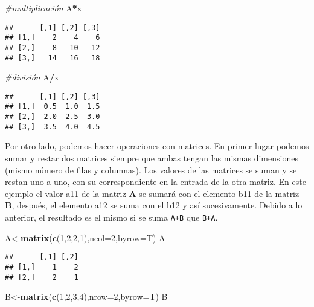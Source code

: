 \documentclass[
]{article}
\newenvironment{Shaded}{\begin{snugshade}}{\end{snugshade}}
\newcommand{\CommentTok}[1]{\textcolor[rgb]{0.56,0.35,0.01}{\textit{#1}}}
\newcommand{\DataTypeTok}[1]{\textcolor[rgb]{0.13,0.29,0.53}{#1}}
\newcommand{\DecValTok}[1]{\textcolor[rgb]{0.00,0.00,0.81}{#1}}
\newcommand{\KeywordTok}[1]{\textcolor[rgb]{0.13,0.29,0.53}{\textbf{#1}}}
\newcommand{\NormalTok}[1]{#1}
\newcommand{\OperatorTok}[1]{\textcolor[rgb]{0.81,0.36,0.00}{\textbf{#1}}}
\begin{document}
\begin{Shaded}
\begin{Highlighting}[]
\CommentTok{\#multiplicación}
\NormalTok{A}\OperatorTok{*}\NormalTok{x}
\end{Highlighting}
\end{Shaded}

\begin{verbatim}
##      [,1] [,2] [,3]
## [1,]    2    4    6
## [2,]    8   10   12
## [3,]   14   16   18
\end{verbatim}

\begin{Shaded}
\begin{Highlighting}[]
\CommentTok{\#división}
\NormalTok{A}\OperatorTok{/}\NormalTok{x}
\end{Highlighting}
\end{Shaded}

\begin{verbatim}
##      [,1] [,2] [,3]
## [1,]  0.5  1.0  1.5
## [2,]  2.0  2.5  3.0
## [3,]  3.5  4.0  4.5
\end{verbatim}

Por otro lado, podemos hacer operaciones con matrices. En primer lugar
podemos sumar y restar dos matrices siempre que ambas tengan las mismas
dimensiones (mismo número de filas y columnas). Los valores de las
matrices se suman y se restan uno a uno, con su correspondiente en la
entrada de la otra matriz. En este ejemplo el valor a11 de la matriz
\textbf{A} se sumará con el elemento b11 de la matriz \textbf{B},
después, el elemento a12 se suma con el b12 y así sucesivamente. Debido
a lo anterior, el resultado es el mismo si se suma \texttt{A+B} que
\texttt{B+A}.

\begin{Shaded}
\begin{Highlighting}[]
\NormalTok{A\textless{}{-}}\KeywordTok{matrix}\NormalTok{(}\KeywordTok{c}\NormalTok{(}\DecValTok{1}\NormalTok{,}\DecValTok{2}\NormalTok{,}\DecValTok{2}\NormalTok{,}\DecValTok{1}\NormalTok{),}\DataTypeTok{ncol=}\DecValTok{2}\NormalTok{,}\DataTypeTok{byrow=}\NormalTok{T)}
\NormalTok{A}
\end{Highlighting}
\end{Shaded}

\begin{verbatim}
##      [,1] [,2]
## [1,]    1    2
## [2,]    2    1
\end{verbatim}

\begin{Shaded}
\begin{Highlighting}[]
\NormalTok{B\textless{}{-}}\KeywordTok{matrix}\NormalTok{(}\KeywordTok{c}\NormalTok{(}\DecValTok{1}\NormalTok{,}\DecValTok{2}\NormalTok{,}\DecValTok{3}\NormalTok{,}\DecValTok{4}\NormalTok{),}\DataTypeTok{nrow=}\DecValTok{2}\NormalTok{,}\DataTypeTok{byrow=}\NormalTok{T)}
\NormalTok{B}
\end{Highlighting}
\end{Shaded}
\end{document}
